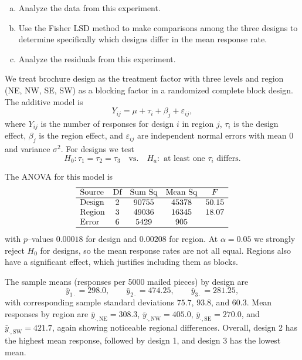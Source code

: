 \documentclass[answers,12pt,addpoints]{exam}
\begin{document}
\begin{questions}
\begin{enumerate}[(a)]
\item Analyze the data from this experiment.
\item Use the Fisher LSD method to make comparisons among the three designs to determine specifically which designs differ in the mean response rate.
\item Analyze the residuals from this experiment.
\end{enumerate}

\begin{solution}
We treat brochure design as the treatment factor with three levels and region (NE, NW, SE, SW) as a blocking factor in a randomized complete block design. The additive model is
\[
Y_{ij} = \mu + \tau_i + \beta_j + \varepsilon_{ij},
\]
where $Y_{ij}$ is the number of responses for design $i$ in region $j$, $\tau_i$ is the design effect, $\beta_j$ is the region effect, and $\varepsilon_{ij}$ are independent normal errors with mean $0$ and variance $\sigma^2$. For designs we test
\[
H_0: \tau_1 = \tau_2 = \tau_3 \quad\text{vs.}\quad H_a:\text{ at least one }\tau_i\text{ differs}.
\]

The ANOVA for this model is
\[
\begin{array}{lcccc}
\hline
\text{Source} & \text{Df} & \text{Sum Sq} & \text{Mean Sq} & F \\
\hline
\text{Design} & 2 & 90755 & 45378 & 50.15 \\
\text{Region} & 3 & 49036 & 16345 & 18.07 \\
\text{Error} & 6 & 5429 & 905 & \\
\hline
\end{array}
\]
with $p$–values $0.00018$ for design and $0.00208$ for region. At $\alpha=0.05$ we strongly reject $H_0$ for designs, so the mean response rates are not all equal. Regions also have a significant effect, which justifies including them as blocks.

The sample means (responses per 5000 mailed pieces) by design are
\[
\bar{y}_{1\cdot} = 298.0,\qquad
\bar{y}_{2\cdot} = 474.25,\qquad
\bar{y}_{3\cdot} = 281.25,
\]
with corresponding sample standard deviations $75.7$, $93.8$, and $60.3$. Mean responses by region are $\bar{y}_{\cdot,\text{NE}} = 308.3$, $\bar{y}_{\cdot,\text{NW}} = 405.0$, $\bar{y}_{\cdot,\text{SE}} = 270.0$, and $\bar{y}_{\cdot,\text{SW}} = 421.7$, again showing noticeable regional differences. Overall, design 2 has the highest mean response, followed by design 1, and design 3 has the lowest mean.


\end{solution}
\end{questions}
\end{document}
